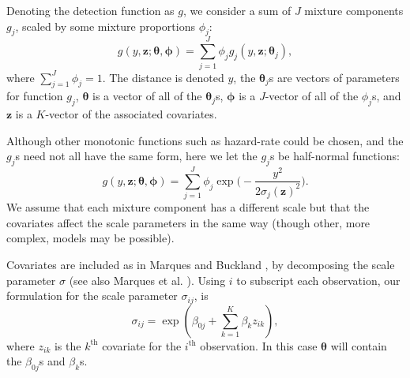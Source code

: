 \documentclass[10pt]{article}
\begin{document}
Denoting the detection function as $g$, we consider a sum of $J$ mixture components $g_j$, scaled by some mixture proportions $\phi_j$:
\begin{equation*}
g(y,\mathbf{z}; \boldsymbol{\theta}, \boldsymbol{\phi}) = \sum_{j=1}^J \phi_j g_j(y,\mathbf{z}; \boldsymbol{\theta}_j),
\end{equation*}
where $\sum_{j=1}^J \phi_j = 1$. The distance is denoted $y$, the $\boldsymbol{\theta}_j$s are vectors of parameters for function $g_j$, $\boldsymbol{\theta}$ is a vector of all of the $\boldsymbol{\theta}_j$s, $\boldsymbol{\phi}$ is a $J$-vector of all of the $\phi_j$s, and $\mathbf{z}$ is a $K$-vector of the associated covariates.  

Although other monotonic functions such as hazard-rate could be chosen, and the $g_j$s need not all have the same form, here we let the $g_j$s be half-normal functions:
\begin{equation*}
g(y,\mathbf{z}; \boldsymbol{\theta}, \boldsymbol{\phi}) = \sum_{j=1}^J \phi_j \exp \Big( - \frac{y^2}{2\sigma_j(\mathbf{z})^2} \Big).
\end{equation*}
We assume that each mixture component has a different scale but that the covariates affect the scale parameters in the same way (though other, more complex, models may be possible).

Covariates are included as in Marques and Buckland \cite{Marques:2003vb}, by decomposing the scale parameter $\sigma$ (see also Marques et al. \cite{Marques:2007vm}).  Using $i$ to subscript each observation, our formulation for the scale parameter $\sigma_{ij}$, is
\begin{equation*}
\sigma_{ij} = \exp( \beta_{0j} + \sum_{k=1}^K \beta_k z_{ik}),
\end{equation*}
where $z_{ik}$ is the $k^\text{th}$ covariate for the $i^\text{th}$ observation. In this case $\boldsymbol{\theta}$ will contain the $\beta_{0j}$s and $\beta_k$s.
\end{document}
